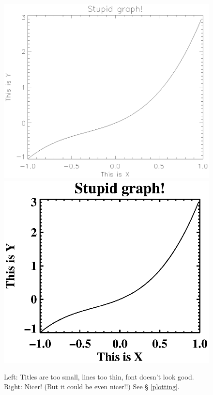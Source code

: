 \documentclass[11pt,preprint]{aastex}
\begin{document}
\begin{itemize}
\begin{figure}[b!]
\begin{center} \leavevmode
\includegraphics[scale=.55]{simple.ps}
\includegraphics[scale=.6]{nicer.ps}
\end{center}
\caption{Left: Titles are too small, lines too thin, font doesn't look
good. Right: Nicer! (But it could be even nicer!!) See \S
\ref{plotting}.  \label{simple}}
\end{figure}
                                                                        


\end{itemize}
\end{document}
